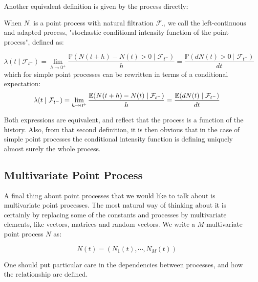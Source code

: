 \documentclass[11pt]{book}
\begin{document}
Another equivalent definition is given by the process directly:


\begin{definition}
When $N_{\cdot}$ is a point process with natural filtration $\mathcal F_{\cdot}$, we call the left-continuous and adapted process, "stochastic conditional intensity function of the point process", defined as:

\begin{equation}
 \lambda(t \mid \mathcal F_{t^-} ) = \lim_{h \to 0^+ } \frac{\mathbb P( N(t+h) - N(t) > 0 \mid \mathcal F_{t^-} )} {h} = \frac{\mathbb P ( dN(t) > 0  \mid \mathcal F_{t^-}) }{dt}
\end{equation}
which for simple point processes can be rewritten in terms of a conditional expectation:
\begin{equation}
 \lambda(t \mid \mathcal F_{t^-} ) = \lim_{h \to 0^+ } \frac{\mathbb E( N(t+h) - N(t)  \mid \mathcal F_{t^-} )} {h} = \frac{\mathbb E ( dN(t)  \mid \mathcal F_{t^-}) }{dt}
\end{equation}
\end{definition}

Both expressions are equivalent, and reflect that the process is a function of the history. Also, from that second definition, it is then obvious that in the case of simple point processes the conditional intensity function is defining uniquely almost surely the whole process.


\subsection{Multivariate Point Process}
A final thing about point processes that we would like to talk about is multivariate point processes. The most natural way of thinking about it is certainly by replacing some of the constants and processes by multivariate elements, like vectors, matrices and random vectors. We write a $M$-multivariate point process $N$ as:

\begin{equation}
N(t) = \left ( N_1(t), \cdots, N_M(t) \right )
\end{equation}

One should put particular care in the dependencies between processes, and how the relationship are defined. 
\end{document}
